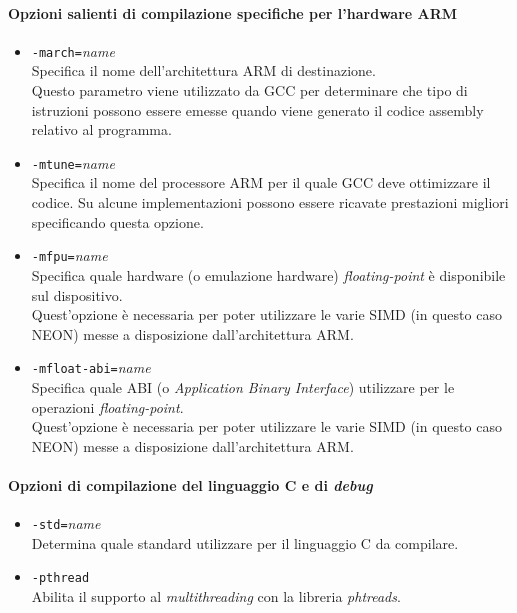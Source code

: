 \paragraph{Opzioni salienti di compilazione specifiche per l'hardware ARM}

\begin{itemize}
  
  \item \verb|-march=|\emph{name}\\
  Specifica il nome dell'architettura ARM di destinazione.\\
  Questo parametro viene utilizzato da GCC per determinare che tipo di 
  istruzioni possono essere emesse quando viene generato il codice assembly 
  relativo al programma.
  
  \item \verb|-mtune=|\emph{name}\\
  Specifica il nome del processore ARM per il quale GCC deve ottimizzare il 
  codice. Su alcune implementazioni possono essere ricavate prestazioni 
  migliori specificando questa opzione.
  
  \item \verb|-mfpu=|\emph{name}\\
  Specifica quale hardware (o emulazione hardware) \emph{floating-point} è 
  disponibile sul dispositivo.\\
  Quest'opzione è necessaria per poter utilizzare le varie SIMD (in 
  questo caso NEON) messe a disposizione dall'architettura ARM.
  
  \item \verb|-mfloat-abi=|\emph{name}\\
  Specifica quale ABI (o \emph{Application Binary Interface}) utilizzare per le 
  operazioni \emph{floating-point}. \\
  Quest'opzione è necessaria per poter utilizzare le varie SIMD (in 
  questo caso NEON) messe a disposizione dall'architettura ARM.
  
\end{itemize}

\paragraph{Opzioni di compilazione del linguaggio C e di \emph{debug}}

\begin{itemize}
  

  
  \item \verb|-std=|\emph{name}\\
  Determina quale standard utilizzare per il linguaggio C da compilare.
  
  \item \verb|-pthread|\\
  Abilita il supporto al \emph{multithreading} con la libreria \emph{phtreads}.
  
\end{itemize}

